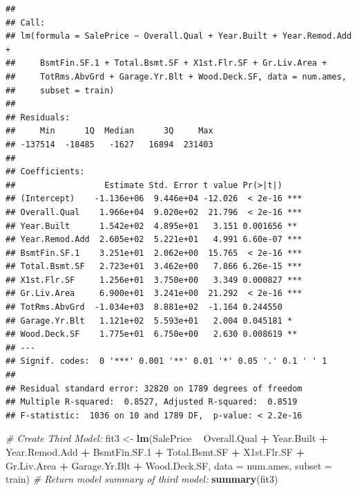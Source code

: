 \documentclass[
]{article}
\newenvironment{Shaded}{\begin{snugshade}}{\end{snugshade}}
\newcommand{\CommentTok}[1]{\textcolor[rgb]{0.56,0.35,0.01}{\textit{#1}}}
\newcommand{\DataTypeTok}[1]{\textcolor[rgb]{0.13,0.29,0.53}{#1}}
\newcommand{\FloatTok}[1]{\textcolor[rgb]{0.00,0.00,0.81}{#1}}
\newcommand{\KeywordTok}[1]{\textcolor[rgb]{0.13,0.29,0.53}{\textbf{#1}}}
\newcommand{\NormalTok}[1]{#1}
\newcommand{\OperatorTok}[1]{\textcolor[rgb]{0.81,0.36,0.00}{\textbf{#1}}}
\newcommand{\StringTok}[1]{\textcolor[rgb]{0.31,0.60,0.02}{#1}}
\begin{document}
\begin{verbatim}
## 
## Call:
## lm(formula = SalePrice ~ Overall.Qual + Year.Built + Year.Remod.Add + 
##     BsmtFin.SF.1 + Total.Bsmt.SF + X1st.Flr.SF + Gr.Liv.Area + 
##     TotRms.AbvGrd + Garage.Yr.Blt + Wood.Deck.SF, data = num.ames, 
##     subset = train)
## 
## Residuals:
##     Min      1Q  Median      3Q     Max 
## -137514  -18485   -1627   16894  231403 
## 
## Coefficients:
##                  Estimate Std. Error t value Pr(>|t|)    
## (Intercept)    -1.136e+06  9.446e+04 -12.026  < 2e-16 ***
## Overall.Qual    1.966e+04  9.020e+02  21.796  < 2e-16 ***
## Year.Built      1.542e+02  4.895e+01   3.151 0.001656 ** 
## Year.Remod.Add  2.605e+02  5.221e+01   4.991 6.60e-07 ***
## BsmtFin.SF.1    3.251e+01  2.062e+00  15.765  < 2e-16 ***
## Total.Bsmt.SF   2.723e+01  3.462e+00   7.866 6.26e-15 ***
## X1st.Flr.SF     1.256e+01  3.750e+00   3.349 0.000827 ***
## Gr.Liv.Area     6.900e+01  3.241e+00  21.292  < 2e-16 ***
## TotRms.AbvGrd  -1.034e+03  8.881e+02  -1.164 0.244550    
## Garage.Yr.Blt   1.121e+02  5.593e+01   2.004 0.045181 *  
## Wood.Deck.SF    1.775e+01  6.750e+00   2.630 0.008619 ** 
## ---
## Signif. codes:  0 '***' 0.001 '**' 0.01 '*' 0.05 '.' 0.1 ' ' 1
## 
## Residual standard error: 32820 on 1789 degrees of freedom
## Multiple R-squared:  0.8527, Adjusted R-squared:  0.8519 
## F-statistic:  1036 on 10 and 1789 DF,  p-value: < 2.2e-16
\end{verbatim}

\begin{Shaded}
\begin{Highlighting}[]
\CommentTok{# Create Third Model:}
\NormalTok{fit3 <-}\StringTok{ }\KeywordTok{lm}\NormalTok{(SalePrice }\OperatorTok{~}\StringTok{ }\NormalTok{Overall.Qual }\OperatorTok{+}\StringTok{ }\NormalTok{Year.Built }\OperatorTok{+}\StringTok{ }\NormalTok{Year.Remod.Add }\OperatorTok{+}\StringTok{ }\NormalTok{BsmtFin.SF}\FloatTok{.1} \OperatorTok{+}\StringTok{ }\NormalTok{Total.Bsmt.SF }\OperatorTok{+}\StringTok{ }\NormalTok{X1st.Flr.SF }\OperatorTok{+}\StringTok{ }\NormalTok{Gr.Liv.Area }\OperatorTok{+}\StringTok{ }\NormalTok{Garage.Yr.Blt }\OperatorTok{+}\StringTok{ }\NormalTok{Wood.Deck.SF, }\DataTypeTok{data =}\NormalTok{ num.ames, }\DataTypeTok{subset =}\NormalTok{ train)}
\CommentTok{# Return model summary of third model:}
\KeywordTok{summary}\NormalTok{(fit3)}
\end{Highlighting}
\end{Shaded}
\end{document}
